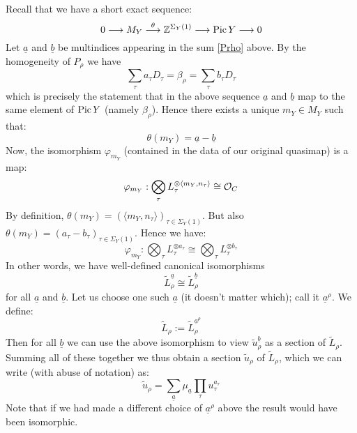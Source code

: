 Recall that we have a short exact sequence:
\begin{equation} \label{Pic short exact sequence for Y} 0 \longrightarrow M_Y \overset{\theta}{\longrightarrow} \mathbb{Z}^{\Sigma_Y(1)} \longrightarrow \operatorname{Pic} Y \longrightarrow 0 \end{equation}
Let $\underline{a}$ and $\underline{b}$ be multindices appearing in the sum \eqref{Prho} above. By the homogeneity of $P_\rho$ we have
\begin{equation*} \sum_\tau a_\tau D_\tau = \beta_\rho = \sum_\tau b_\tau D_\tau \end{equation*}
which is precisely the statement that in the above sequence $\underline{a}$ and $\underline{b}$ map to the same element of $\operatorname{Pic} Y$ (namely $\beta_\rho$). Hence there exists a unique $m_Y \in M_Y$ such that:
\begin{equation*} \theta(m_Y) = \underline{a} - \underline{b} \end{equation*}
Now, the isomorphism $\varphi_{m_Y}$ (contained in the data of our original quasimap) is a map:
\begin{equation*} \varphi_{m_Y} : \bigotimes_\tau L_\tau^{\otimes \langle m_Y, n_\tau \rangle} \cong \mathcal{O}_{C} \end{equation*}
By definition, $\theta(m_Y) = (\langle m_Y,n_\tau \rangle)_{\tau \in \Sigma_Y(1)}$. But also $\theta(m_Y) = (a_\tau - b_\tau)_{\tau \in \Sigma_Y(1)}$. Hence we have:
\begin{equation*} \varphi_{m_Y} : \bigotimes_\tau L_\tau^{\otimes a_\tau} \cong \bigotimes_\tau L_\tau^{\otimes b_\tau} \end{equation*}
In other words, we have well-defined canonical isomorphisms
\begin{equation*} \tilde{L}_\rho^{\underline{a}} \cong \tilde{L}_\rho^{\underline{b}} \end{equation*}
for all $\underline{a}$ and $\underline{b}$. Let us choose one such $\underline{a}$ (it doesn't matter which); call it $\underline{a}^\rho$. We define:
\begin{equation*} \tilde{L}_\rho := \tilde{L}_\rho^{\underline{a}^\rho} \end{equation*}
Then for all $\underline{b}$ we can use the above isomorphism to view $\tilde{u}_\rho^{\underline{b}}$ as a section of $\tilde{L}_\rho$. Summing all of these together we thus obtain a section $\tilde{u}_\rho$ of $\tilde{L}_\rho$, which we can write (with abuse of notation) as:
\begin{equation*} \tilde{u}_\rho = \sum_{\underline{a}} \mu_{\underline{a}} \prod_\tau u_\tau^{a_\tau} \end{equation*}
Note that if we had made a different choice of $\underline{a}^\rho$ above the result would have been isomorphic.

